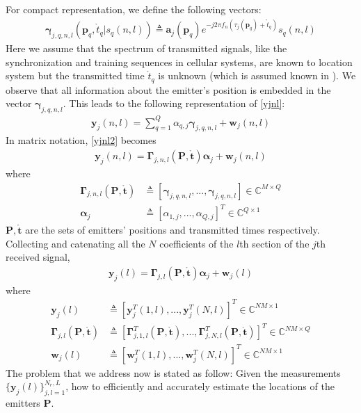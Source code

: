 \documentclass[review]{elsarticle}
\begin{document}
For compact representation, we define the following vectors:
\begin{align}\label{gamma}
    \boldsymbol{\gamma}_{j,q,n,l}(\boldsymbol{p}_q,\mathring{t}_q\vert s_q(n,l))\triangleq\boldsymbol{a}_j(\boldsymbol{p}_q)e^{-j2\pi f_n(\tau_j(\boldsymbol{p}_q)+\mathring{t}_q)}s_q(n,l)
\end{align}
Here we assume that the spectrum of transmitted signals, like the synchronization and training sequences in cellular systems, are known to location system but the transmitted time $\mathring{t}_q$ is unknown (which is assumed known in \cite{DPD2005}). We observe that all information about the emitter’s position is embedded in the vector $\boldsymbol{\gamma}_{j,q,n,l}$. This leads to the following representation of \eqref{yjnl}:
\begin{align}\label{yjnl2}
    \boldsymbol{y}_j(n,l)=\sum_{q=1}^Q\alpha_{q,j}\boldsymbol{\gamma}_{j,q,n,l}+\boldsymbol{w}_j(n,l)
\end{align}
In matrix notation, \eqref{yjnl2} becomes
\begin{align}
    \boldsymbol{y}_j(n,l)=\boldsymbol{\Gamma}_{j,n,l}(\boldsymbol{P},\mathring{\boldsymbol{t}})\boldsymbol{\alpha}_j+\boldsymbol{w}_j(n,l)
\end{align}
where  
\begin{align}\label{Gammajnl}
    \boldsymbol{\Gamma}_{j,n,l}(\boldsymbol{P},\mathring{\boldsymbol{t}})&\triangleq[\boldsymbol{\gamma}_{j,q,n,l},...,\boldsymbol{\gamma}_{j,q,n,l}]\in \mathbb{C}^{M\times Q}\\ \nonumber
    \boldsymbol{\alpha}_j&\triangleq[\alpha_{1,j},...,\alpha_{Q,j}]^T\in \mathbb{C}^{Q\times 1} 
\end{align}
$\boldsymbol{P},\mathring{\boldsymbol{t}}$ are the sets of emitters' positions and transmitted times respectively.
Collecting and catenating all the $N$ coefficients of the $l$th section of the $j$th received signal,
\begin{align}
    \boldsymbol{y}_j(l)=\boldsymbol{\Gamma}_{j,l}(\boldsymbol{P},\mathring{\boldsymbol{t}})\boldsymbol{\alpha}_j+\boldsymbol{w}_j(l)
\end{align}
where
\begin{align}\label{Gammajl}
    \boldsymbol{y}_j(l)&\triangleq[\boldsymbol{y}_j^T(1,l),...,\boldsymbol{y}_j^T(N,l)]^T\in \mathbb{C}^{NM\times 1}\\ \nonumber
    \boldsymbol{\Gamma}_{j,l}(\boldsymbol{P},\mathring{\boldsymbol{t}})&\triangleq[\boldsymbol{\Gamma}_{j,1,l}^T(\boldsymbol{P},\mathring{\boldsymbol{t}}),...,\boldsymbol{\Gamma}_{j,N,l}^T(\boldsymbol{P},\mathring{\boldsymbol{t}})]^T\in \mathbb{C}^{NM\times Q}\\ 
    \boldsymbol{w}_j(l)&\triangleq[\boldsymbol{w}_j^T(1,l),...,\boldsymbol{w}_j^T(N,l)]^T\in \mathbb{C}^{NM\times 1}\nonumber
\end{align}
The problem that we address now is stated as follow: Given the measurements $\lbrace\boldsymbol{y}_j(l)\rbrace_{j,l=1}^{N_r,L}$, how to efficiently and accurately estimate the locations of the emitters $\boldsymbol{P}$.
\end{document}
